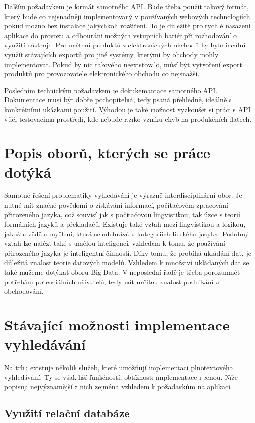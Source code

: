 \documentclass[FM,DP]{tulthesis}
\begin{document}
Dalším požadavkem je formát samotného API. Bude třeba použít takový formát, který bude
co nejsnadněji implementovaný v používaných webových technologiích pokud možno bez instalace
jakýchkoli rozšíření. To je důležité pro rychlé nasazení aplikace do provozu a odbourání
možných vstupních bariér při rozhodování o využití nástroje. Pro načtení produktů
z elektronických obchodů by bylo ideální využít stávajících exportů pro jiné systémy, 
kterými by obchody mohly implementovat. Pokud by nic takového neexistovalo, můsí být vytvoření
export produktů pro provozovatele elektronického obchodu co nejsnažší.

Posledním technickým požadavkem je dokukemantace samotného API. Dokumentace musí být
dobře pochopitelná, tedy psaná přehledně, ideálně s konkrétními ukázkami použití.
Výhodou je také možnost vyzkoušet si práci s API vůči testovacímu prostředí, 
kde nebude riziko vzniku chyb na produkčních datech.

\section{Popis oborů, kterých se práce dotýká}

Samotné řešení problematiky vyhledávání je výrazně interdisciplinární obor. Je nutné
mít značné povědomí o získávání informací, počítačovém zpracování přirozeného jazyka, 
což souvisí jak s počítačovou lingvistikou, tak úzce s teorií formálních jazyků a překladačů.
Existuje také vztah mezi lingvistikou a logikou, jakožto vědě o myšlení, která se odehrává 
v kategoriích lidského jazyka. Podobný vztah lze nalézt také s umělou inteligencí, 
vzhledem k tomu, že používání přirozeného jazyka je inteligentní činností.
Díky tomu, že probíhá ukládání dat, je důležitá znalost teorie datových modelů.
Vzhledem k množství ukládaných dat se také můžeme dotýkat oboru Big Data.
V neposlední řadě je třeba porozumnět potřebám potenciálních uživatelů, tedy mít
určitou znalost podnikání a obchodování.

\section{Stávající možnosti implementace vyhledávání}

Na trhu existuje několik služeb, které umožňují implementaci plnotextového vyhledávání.
Ty se však liší funkčností, obtížností implementace i cenou. Níže popisuji nejvýznamější 
z nich zejména vzhledem k požadavkům na aplikaci.

\subsection{Využití relační databáze}
\end{document}
